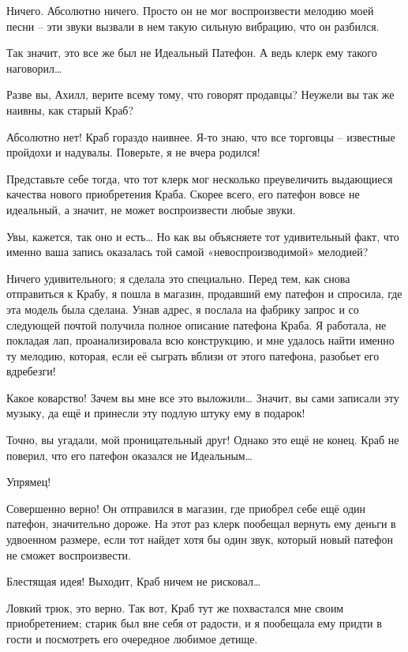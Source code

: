 \documentclass[../main.tex]{subfiles}
\begin{document}
\begin{dialogue}
 Ничего. Абсолютно ничего. Просто он не мог воспроизвести мелодию моей песни \--- эти звуки вызвали в нем такую сильную вибрацию, что он разбился.

 Так значит, это все же был не Идеальный Патефон. А ведь клерк ему такого наговорил\ldots{}

 Разве вы, Ахилл, верите всему тому, что говорят продавцы? Неужели вы так же наивны, как старый Краб?

 Абсолютно нет! Краб гораздо наивнее. Я-то знаю, что все торговцы \--- известные пройдохи и надувалы. Поверьте, я не вчера родился!

 Представьте себе тогда, что тот клерк мог несколько преувеличить выдающиеся качества нового приобретения Краба. Скорее всего, его патефон вовсе не идеальный, а значит, не может воспроизвести любые звуки.

 Увы, кажется, так оно и есть\ldots{} Но как вы объясняете тот удивительный факт, что именно ваша запись оказалась той самой «невоспроизводимой» мелодией?

 Ничего удивительного; я сделала это специально. Перед тем, как снова отправиться к Крабу, я пошла в магазин, продавший ему патефон и спросила, где эта модель была сделана. Узнав адрес, я послала на фабрику запрос и со следующей почтой получила полное описание патефона Краба. Я работала, не покладая лап, проанализировала всю конструкцию, и мне удалось найти именно ту мелодию, которая, если её сыграть вблизи от этого патефона, разобьет его вдребезги!

 Какое коварство! Зачем вы мне все это выложили\ldots{} Значит, вы сами записали эту музыку, да ещё и принесли эту подлую штуку ему в подарок!

 Точно, вы угадали, мой проницательный друг! Однако это ещё не конец. Краб не поверил, что его патефон оказался не Идеальным\ldots{}

 Упрямец!

 Совершенно верно! Он отправился в магазин, где приобрел себе ещё один патефон, значительно дороже. На этот раз клерк пообещал вернуть ему деньги в удвоенном размере, если тот найдет хотя бы один звук, который новый патефон не сможет воспроизвести.

 {\Large Б}лестящая идея! Выходит, Краб ничем не рисковал\ldots{}

 Ловкий трюк, это верно. Так вот, Краб тут же похвастался мне своим приобретением; старик был вне себя от радости, и я пообещала ему придти в гости и посмотреть его очередное любимое детище.


\end{dialogue}
\end{document}
